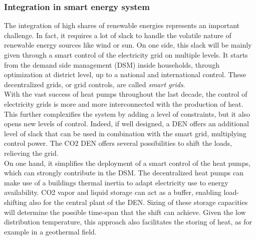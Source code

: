 \documentclass{article}
\begin{document}
\subsubsection{Integration in smart energy system}
The integration of high shares of renewable energies represents an important challenge. In fact, it requires a lot of slack to handle the volatile nature of renewable energy sources like wind or sun. On one side, this slack will be mainly given through a smart control of the electricity grid on multiple levels. It starts from the demand side management (DSM) inside households, through optimization at district level, up to a national and international control. These decentralized grids, or grid controls, are called \textit{smart grids}. \\

With the vast success of heat pumps throughout the last decade, the control of electricity grids is more and more interconnected with the production of heat. This further complexifies the system by adding a level of constraints, but it also opens new levels of control. Indeed, if well designed, a DEN offers an additional level of slack that can be used in combination with the smart grid, multiplying control power. The CO2 DEN offers several possibilities to shift the loads, relieving the grid. \\

On one hand, it simplifies the deployment of a smart control of the heat pumps, which can strongly contribute in the DSM. The decentralized heat pumps can make use of a buildings thermal inertia to adapt electricity use to energy availability. CO2 vapor and liquid storage can act as a buffer, enabling load-shifting also for the central plant of the DEN. Sizing of these storage capacities will determine the possible time-span that the shift can achieve. Given the low distribution temperature, this approach also facilitates the storing of heat, as for example in a geothermal field.
\end{document}
